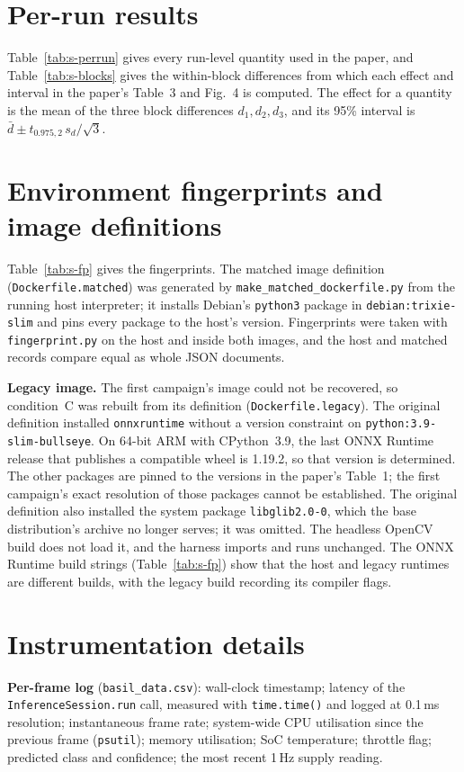 \documentclass[10pt]{article}
\begin{document}
\section{Per-run results}
Table~\ref{tab:s-perrun} gives every run-level quantity used in the paper, and Table~\ref{tab:s-blocks} gives the within-block differences from which each effect and interval in the paper's Table~3 and Fig.~4 is computed. The effect for a quantity is the mean of the three block differences $d_1,d_2,d_3$, and its 95\% interval is $\bar d \pm t_{0.975,2}\, s_d/\sqrt3$.

\section{Environment fingerprints and image definitions}
Table~\ref{tab:s-fp} gives the fingerprints. The matched image definition (\texttt{Dockerfile.matched}) was generated by \texttt{make\_matched\_dockerfile.py} from the running host interpreter; it installs Debian's \texttt{python3} package in \texttt{debian:trixie-slim} and pins every package to the host's version. Fingerprints were taken with \texttt{fingerprint.py} on the host and inside both images, and the host and matched records compare equal as whole JSON documents.

\textbf{Legacy image.} The first campaign's image could not be recovered, so condition~C was rebuilt from its definition (\texttt{Dockerfile.legacy}). The original definition installed \texttt{onnxruntime} without a version constraint on \texttt{python:3.9-slim-bullseye}. On 64-bit ARM with CPython~3.9, the last ONNX Runtime release that publishes a compatible wheel is 1.19.2, so that version is determined. The other packages are pinned to the versions in the paper's Table~1; the first campaign's exact resolution of those packages cannot be established. The original definition also installed the system package \texttt{libglib2.0-0}, which the base distribution's archive no longer serves; it was omitted. The headless OpenCV build does not load it, and the harness imports and runs unchanged. The ONNX Runtime build strings (Table~\ref{tab:s-fp}) show that the host and legacy runtimes are different builds, with the legacy build recording its compiler flags.

\section{Instrumentation details}
\textbf{Per-frame log} (\texttt{basil\_data.csv}): wall-clock timestamp; latency of the \texttt{InferenceSession.run} call, measured with \texttt{time.time()} and logged at 0.1\,ms resolution; instantaneous frame rate; system-wide CPU utilisation since the previous frame (\texttt{psutil}); memory utilisation; SoC temperature; throttle flag; predicted class and confidence; the most recent 1\,Hz supply reading.
\end{document}
